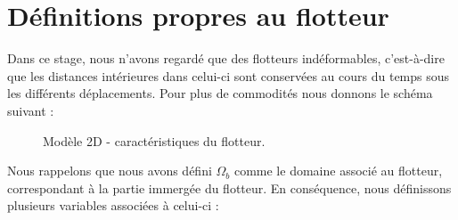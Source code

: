 \section{Définitions propres au flotteur}
\noindent Dans ce stage, nous n'avons regardé que des flotteurs indéformables, c'est-à-dire que les distances intérieures dans celui-ci sont conservées au cours du temps sous les différents déplacements. Pour plus de commodités nous donnons le schéma suivant :
\begin{figure}[H]
	\centering
	\caption{Modèle 2D - caractéristiques du flotteur.}
	\label{fig:2dflotteur}
\end{figure}
\noindent Nous rappelons que nous avons défini $\Omega_b$ comme le domaine associé au flotteur, correspondant à la partie immergée du flotteur.
En conséquence, nous définissons plusieurs variables associées à celui-ci : 

